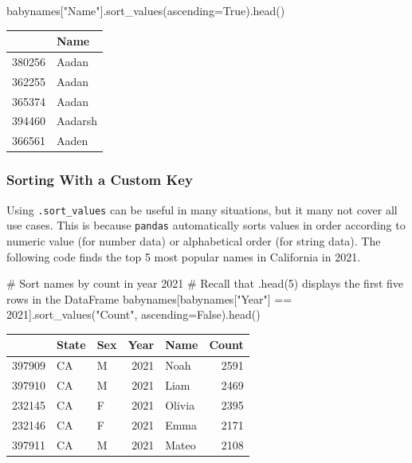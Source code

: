 \documentclass[
  letterpaper,
  DIV=11,
  numbers=noendperiod]{scrreprt}
\newenvironment{Shaded}{\begin{snugshade}}{\end{snugshade}}
\newcommand{\CommentTok}[1]{\textcolor[rgb]{0.37,0.37,0.37}{#1}}
\newcommand{\DecValTok}[1]{\textcolor[rgb]{0.68,0.00,0.00}{#1}}
\newcommand{\NormalTok}[1]{\textcolor[rgb]{0.00,0.23,0.31}{#1}}
\newcommand{\OperatorTok}[1]{\textcolor[rgb]{0.37,0.37,0.37}{#1}}
\newcommand{\StringTok}[1]{\textcolor[rgb]{0.13,0.47,0.30}{#1}}
\newcommand{\VariableTok}[1]{\textcolor[rgb]{0.07,0.07,0.07}{#1}}
\begin{document}
\begin{Shaded}
\begin{Highlighting}[]
\NormalTok{babynames[}\StringTok{"Name"}\NormalTok{].sort\_values(ascending}\OperatorTok{=}\VariableTok{True}\NormalTok{).head()}
\end{Highlighting}
\end{Shaded}

\begin{tabular}{ll}
\toprule
{} &     Name \\
\midrule
380256 &    Aadan \\
362255 &    Aadan \\
365374 &    Aadan \\
394460 &  Aadarsh \\
366561 &    Aaden \\
\bottomrule
\end{tabular}

\hypertarget{sorting-with-a-custom-key}{%
\subsubsection{Sorting With a Custom
Key}\label{sorting-with-a-custom-key}}

Using \texttt{.sort\_values} can be useful in many situations, but it
many not cover all use cases. This is because \texttt{pandas}
automatically sorts values in order according to numeric value (for
number data) or alphabetical order (for string data). The following code
finds the top 5 most popular names in California in 2021.

\begin{Shaded}
\begin{Highlighting}[]
\CommentTok{\# Sort names by count in year 2021}
\CommentTok{\# Recall that \textasciigrave{}.head(5)\textasciigrave{} displays the first five rows in the DataFrame}
\NormalTok{babynames[babynames[}\StringTok{"Year"}\NormalTok{] }\OperatorTok{==} \DecValTok{2021}\NormalTok{].sort\_values(}\StringTok{"Count"}\NormalTok{, ascending}\OperatorTok{=}\VariableTok{False}\NormalTok{).head()}
\end{Highlighting}
\end{Shaded}

\begin{tabular}{lllrlr}
\toprule
{} & State & Sex &  Year &    Name &  Count \\
\midrule
397909 &    CA &   M &  2021 &    Noah &   2591 \\
397910 &    CA &   M &  2021 &    Liam &   2469 \\
232145 &    CA &   F &  2021 &  Olivia &   2395 \\
232146 &    CA &   F &  2021 &    Emma &   2171 \\
397911 &    CA &   M &  2021 &   Mateo &   2108 \\
\bottomrule
\end{tabular}
\end{document}
